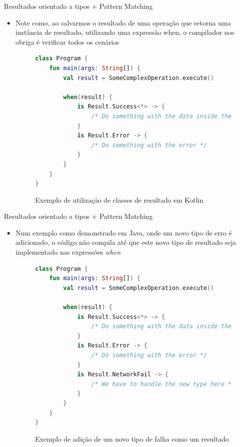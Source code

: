 \documentclass[brazilian]{beamer}
\begin{document}
\begin{frame}[fragile]{Resultados orientado a tipos + Pattern Matching}
    \begin{itemize}
        \item Note como, ao salvarmos o resultado de uma operação que retorna uma instância de resultado, utilizando uma expressâo when, o compilador nos obriga é verificar todos os cenários
        \begin{figure}[H]
            \centering
            \begin{lstlisting}[language=Kotlin]
class Program {
    fun main(args: String[]) {
        val result = SomeComplexOperation.execute()

        when(result) {
            is Result.Success<*> -> {
                /* Do something with the data inside the success object */
            }
            is Result.Error -> {
                /* Do something with the error */
            }
        }
    }
}
            \end{lstlisting}
            \caption{Exemplo de utilização de classes de resultado em Kotlin}
            \label{fig:kotlin_result_class_example}
        \end{figure}
    \end{itemize}
\end{frame}

\begin{frame}[fragile]{Resultados orientado a tipos + Pattern Matching}
    \begin{itemize}
        \item Num exemplo como demonstrado em Java, onde um novo tipo de erro é adicionado, o código não compila até que este novo tipo de resultado seja implementado nas expressões \emph{when}
        \begin{figure}[H]
            \centering
            \begin{lstlisting}[language=Kotlin]
class Program {
    fun main(args: String[]) {
        val result = SomeComplexOperation.execute()

        when(result) {
            is Result.Success<*> -> {
                /* Do something with the data inside the success object */
            }
            is Result.Error -> {
                /* Do something with the error */
            }
            is Result.NetworkFail -> {
                /* We have to handle the new type here */
            }
        }
    }
}
            \end{lstlisting}
            \caption{Exemplo de adição de um novo tipo de falha como um resultado}
            \label{fig:kotlin_result_class_example_with_new_type}
        \end{figure}
    \end{itemize}
\end{frame}
\end{document}
